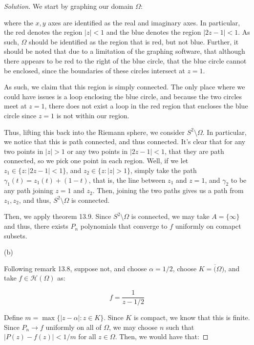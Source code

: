 \documentclass[10pt]{article}
\begin{document}
\begin{proof}[Solution]

We start by graphing our domain $\Omega$:


where the $x,y$ axes are identified as the real and imaginary axes. In particular, the red denotes the region $|z| < 1$ and the blue denotes the region $|2z - 1| < 1$. As such, $\Omega$ should be identified as the region that is red, but not blue. Further, it should be noted that due to a limitation of the graphing software, that although there appears to be red to the right of the blue circle, that the blue circle cannot be enclosed, since the boundaries of these circles intersect at $z = 1$.

As such, we claim that this region is simply connected. The only place where we could have issues is a loop enclosing the blue circle, and because the two circles meet at $z = 1$, there does not exist a loop in the red region that encloses the blue circle since $z=1$ is not within our region.

Thus, lifting this back into the Riemann sphere, we consider $S^2 \setminus \Omega$. In particular, we notice that this is path connected, and thus connected. It's clear that for any two points in $|z| > 1$ or any two points in $|2z - 1| < 1$, that they are path connected, so we pick one point in each region. Well, if we let $z_1 \in \{ z : |2z - 1| < 1 \}$, and $z_2 \in \{ z : |z| > 1 \}$, simply take the path $\gamma_1(t) = z_1(t) + (1-t)$, that is, the line between $z_1$ and $z = 1$, and $\gamma_2$ to be any path joining $z=1$ and $z_2$. Then, joining the two paths gives us a path from $z_1, z_2$, and thus, $S^2 \setminus \Omega$ is connected.

Then, we apply theorem 13.9. Since $S^2 \setminus \Omega$ is connected, we may take $A = \{ \infty \}$ and thus, there exists $P_n$ polynomials that converge to $f$ uniformly on comapct subsets.

(b)

Following remark 13.8, suppose not, and choose $\alpha = 1/2$, choose $K = \overline(\Omega)$, and take $f \in \mathcal{H}(\Omega)$ as:

$$ f= \frac{1}{z - 1/2}$$

Define $m = \max\{ |z - \alpha | : z \in K \}$. Since $K$ is compact, we know that this is finite. Since $P_n \to f$ uniformly on all of $\Omega$, we may choose $n$ such that $|P(z) - f(z)| < 1/m$ for all $z \in \Omega$. Then, we would have that:


\end{proof}
\end{document}

